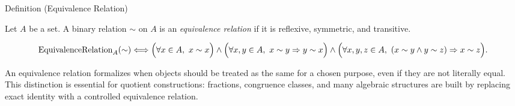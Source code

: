 \begin{definitionbox}{Definition (Equivalence Relation)}
\begin{definition}
\label{def:equivalence-relation}
Let $A$ be a set. A binary relation $\sim$ on $A$ is an
\emph{equivalence relation} if it is reflexive, symmetric, and transitive.
\end{definition}

\begin{remark*}
\[
\operatorname{EquivalenceRelation}_A(\sim)
\Longleftrightarrow
\Bigl(\forall x \in A,\ x \sim x\Bigr)
\land
\Bigl(\forall x,y \in A,\ x \sim y \Rightarrow y \sim x\Bigr)
\land
\Bigl(\forall x,y,z \in A,\ (x \sim y \land y \sim z) \Rightarrow x \sim z\Bigr).
\]
\end{remark*}

\begin{remark*}[Interpretation]
An equivalence relation formalizes when objects should be treated as the same
for a chosen purpose, even if they are not literally equal. This distinction
is essential for quotient constructions: fractions, congruence classes, and
many algebraic structures are built by replacing exact identity with a
controlled equivalence relation.
\end{remark*}

\NoLocalDependencies
\end{definitionbox}
